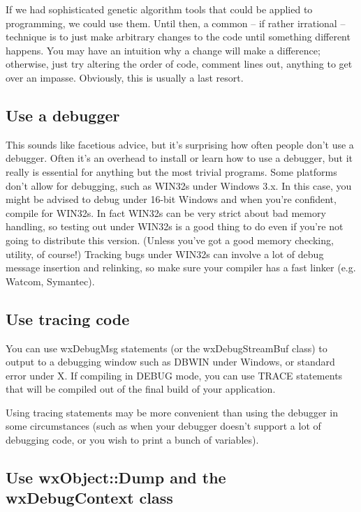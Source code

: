 If we had sophisticated genetic algorithm tools that could be applied
to programming, we could use them. Until then, a common -- if rather irrational --
technique is to just make arbitrary changes to the code until something
different happens. You may have an intuition why a change will make a difference;
otherwise, just try altering the order of code, comment lines out, anything
to get over an impasse. Obviously, this is usually a last resort.

\subsection{Use a debugger}

This sounds like facetious advice, but it's surprising how often people
don't use a debugger. Often it's an overhead to install or learn how to
use a debugger, but it really is essential for anything but the most
trivial programs. Some platforms don't allow for debugging, such
as WIN32s under Windows 3.x. In this case, you might be advised to
debug under 16-bit Windows and when you're confident, compile for
WIN32s. In fact WIN32s can be very strict about bad memory handling,
so testing out under WIN32s is a good thing to do even if you're
not going to distribute this version. (Unless you've got a good memory checking,
utility, of course!) Tracking bugs under WIN32s can involve a lot of debug message
insertion and relinking, so make sure your compiler has a fast linker
(e.g. Watcom, Symantec).

\subsection{Use tracing code}

You can use wxDebugMsg statements (or the wxDebugStreamBuf class) to
output to a debugging window such as DBWIN under Windows, or standard
error under X. If compiling in DEBUG mode, you can use TRACE statements
that will be compiled out of the final build of your application.

Using tracing statements may be more convenient than using the debugger
in some circumstances (such as when your debugger doesn't support a lot
of debugging code, or you wish to print a bunch of variables).

\subsection{Use wxObject::Dump and the wxDebugContext class}

